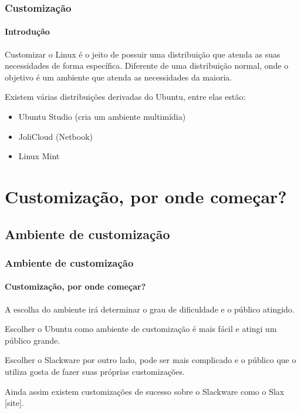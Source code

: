 \begin{frame}\frametitle{Customização}\framesubtitle{Introdução}

Customizar o Linux é o jeito de possuir uma distribuição que atenda as suas necessidades de forma específica.
Diferente de uma distribuição normal, onde o objetivo é um ambiente que atenda as necessidades da maioria.

\medskip

Existem várias distribuições derivadas do Ubuntu, entre elas estão:
\begin{itemize}
	\item Ubuntu Studio (cria um ambiente multimídia)
	\item JoliCloud (Netbook)
	\item Linux Mint
\end{itemize}

\end{frame}

\section{Customização, por onde começar?}

\begin{frame}


\end{frame}

\subsection{Ambiente de customização}

\begin{frame}


\end{frame}

\begin{frame}\frametitle{Ambiente de customização}\framesubtitle{Customização, por onde começar?}

A escolha do ambiente irá determinar o grau de dificuldade e o público atingido.

\medskip

Escolher o Ubuntu como ambiente de customização é mais fácil e atingi um público grande.

\medskip

Escolher o Slackware por outro lado, pode ser mais complicado e o público que o utiliza
gosta de fazer suas próprias customizações.

\medskip

Ainda assim existem customizações de sucesso sobre o Slackware como o Slax [site].

\end{frame}


